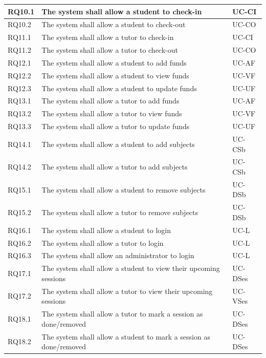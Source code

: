 \documentclass[12pt]{article}
\begin{document}
{\begin{longtable}{| l | p{10cm}| l |}
				RQ10.1 & The system shall allow a student to check-in  & UC-CI \\ \hline	
				RQ10.2 & The system shall allow a student to check-out  & UC-CO \\ \hline
				RQ11.1 & The system shall allow a tutor to check-in  & UC-CI \\ 
\hline	
				RQ11.2 & The system shall allow a tutor to check-out  & UC-CO \\ \hline
				RQ12.1 & The system shall allow a student to add funds &UC-AF\\ \hline
				RQ12.2 & The system shall allow a student to view funds &UC-VF\\ \hline
				RQ12.3 & The system shall allow a student to update funds &UC-UF\\ \hline
				RQ13.1 & The system shall allow a tutor to add funds &UC-AF\\ \hline
				RQ13.2 & The system shall allow a tutor to view funds &UC-VF\\ \hline
				RQ13.3 & The system shall allow a tutor to update funds &UC-UF\\ \hline
				RQ14.1 & The system shall allow a student to add subjects &UC-CSb\\ \hline
				RQ14.2 & The system shall allow a tutor to add subjects &UC-CSb\\ \hline				
				RQ15.1 & The system shall allow a student to remove subjects &UC-DSb\\ \hline
				RQ15.2 & The system shall allow a tutor to remove subjects &UC-DSb\\ \hline				
				RQ16.1 & The system shall allow a student to login &UC-L\\ \hline
				RQ16.2 & The system shall allow a tutor to login &UC-L\\ \hline
				RQ16.3 & The system shall allow an administrator to login &UC-L\\ \hline
				RQ17.1 & The system shall allow a student to view their upcoming sessions  &UC-DSes\\ \hline
				RQ17.2 & The system shall allow a tutor to view their upcoming sessions  &UC-VSes\\ \hline
				RQ18.1 & The system shall allow a tutor to mark a session as done/removed &UC-DSes\\ \hline
				RQ18.2 & The system shall allow a student to mark a session as done/removed &UC-DSes\\ \hline
		
\end{longtable}
}
\end{document}
